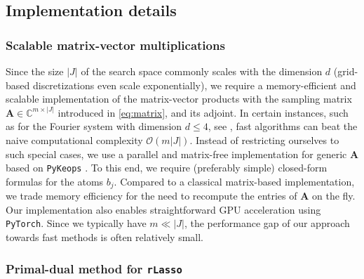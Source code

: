 \documentclass[11pt,reqno, a4paper]{article}
\numberwithin{equation}{section}
\newcommand{\rlasso}{\texttt{rLasso}}
\begin{document}
\subsection{Implementation details}
\subsubsection{Scalable matrix-vector multiplications}
Since the size $\lvert J\rvert$ of the search space commonly scales with the dimension $d$ (grid-based discretizations even scale exponentially), we require a memory-efficient and scalable implementation of the matrix-vector products with the sampling matrix  $\mathbf{A} \in \mathbb{C}^{m \times \lvert J\rvert}$ introduced in \eqref{eq:matrix}, and its adjoint.
In certain instances, such as for the Fourier system with dimension $d \leq 4$, see \cite{B1995,PlPoStTa23}, fast algorithms can beat the naive computational complexity $\mathcal{O}(m\lvert J\rvert)$.
Instead of restricting ourselves to such special cases, we use a parallel and matrix-free implementation for generic $\mathbf{A}$ based on \texttt{PyKeops}  \cite{ChaFeyGla2021}.
To this end, we require (preferably simple) closed-form formulas for the atoms $b_j$.
Compared to a classical matrix-based implementation, we trade memory efficiency for the need to recompute the entries of $\mathbf{A}$ on the fly.
Our implementation also enables straightforward GPU acceleration using \texttt{PyTorch}.
Since we typically have $m \ll \lvert J\rvert$, the performance gap of our approach towards fast methods is often relatively small.

\subsubsection{Primal-dual method for \rlasso}
\end{document}
